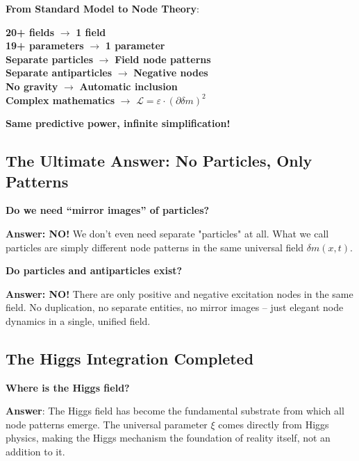 \documentclass[12pt,a4paper]{article}
\newcommand{\Lag}{\mathcal{L}}
\newcommand{\deltam}{\delta m}
\newcommand{\xipar}{\xi}
\theoremstyle{definition}
\theoremstyle{remark}
\begin{document}
	\begin{tcolorbox}[colback=green!5!white,colframe=green!75!black,title=Revolutionary Achievement]
		\textbf{From Standard Model to Node Theory}:
		
		\begin{center}
			\textbf{20+ fields} $\rightarrow$ \textbf{1 field} \\[0.5em]
			\textbf{19+ parameters} $\rightarrow$ \textbf{1 parameter} \\[0.5em]
			\textbf{Separate particles} $\rightarrow$ \textbf{Field node patterns} \\[0.5em]
			\textbf{Separate antiparticles} $\rightarrow$ \textbf{Negative nodes} \\[0.5em]
			\textbf{No gravity} $\rightarrow$ \textbf{Automatic inclusion} \\[0.5em]
			\textbf{Complex mathematics} $\rightarrow$ \textbf{$\Lag = \varepsilon \cdot (\partial \deltam)^2$}
		\end{center}
		
		\textbf{Same predictive power, infinite simplification!}
	\end{tcolorbox}
	
	\subsection{The Ultimate Answer: No Particles, Only Patterns}
	
	\textbf{Do we need ``mirror images'' of particles?}
	
	\textbf{Answer: NO!} We don't even need separate "particles" at all. What we call particles are simply different node patterns in the same universal field $\deltam(x,t)$.
	
	\textbf{Do particles and antiparticles exist?}
	
	\textbf{Answer: NO!} There are only positive and negative excitation nodes in the same field. No duplication, no separate entities, no mirror images -- just elegant node dynamics in a single, unified field.
	
	\subsection{The Higgs Integration Completed}
	
	\textbf{Where is the Higgs field?}
	
	\textbf{Answer}: The Higgs field has become the fundamental substrate from which all node patterns emerge. The universal parameter $\xipar$ comes directly from Higgs physics, making the Higgs mechanism the foundation of reality itself, not an addition to it.
	
\end{document}

